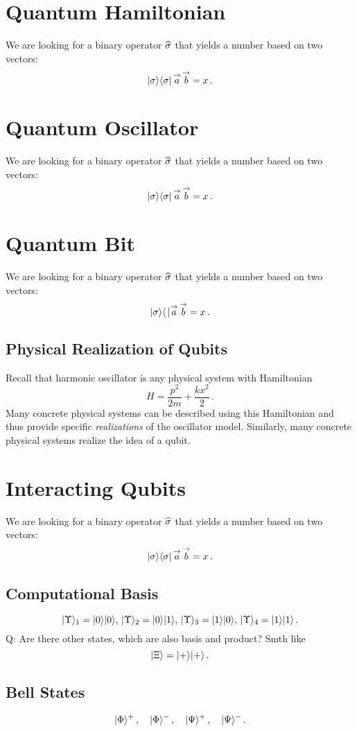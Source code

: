\section{Quantum Hamiltonian}\label{sec:QuantumHamiltonian}
We are looking for a binary operator $\widehat{\sigma}$ that yields a number
based on two vectors:
\[
|{\sigma}\rangle\langle{\sigma}|\,\overset{\rightarrow}{a}\,\overset{\rightarrow}{b}=x\,.
\]

\section{Quantum Oscillator}\label{sec:QuantumOscillator}
We are looking for a binary operator $\widehat{\sigma}$ that yields a number
based on two vectors:
\[
|{\sigma}\rangle\langle{\sigma}|\,\overset{\rightarrow}{a}\,\overset{\rightarrow}{b}=x\,.
\]

\section{Quantum Bit}\label{sec:Qubit}
We are looking for a binary operator $\widehat{\sigma}$ that yields a number
based on two vectors:
\[
|{\sigma}\rangle\langle{\,}|\overset{\rightarrow}{a}\,\overset{\rightarrow}{b}=x\,.
\]
\subsection{Physical Realization of Qubits}
Recall that harmonic oscillator is any physical system with Hamiltonian
\[
H = \frac{p^2}{2m}+\frac{kx^2}{2}\,.
\] 
Many concrete physical systems can be described using this Hamiltonian and thus provide specific \emph{realizations} of 
the oscillator model. Similarly, many concrete physical systems realize the idea of a qubit.

\section{Interacting Qubits}\label{sec:InteractingQubits}
We are looking for a binary operator $\widehat{\sigma}$ that yields a number
based on two vectors:
\[
|{\sigma}\rangle\langle{\sigma}|\,\overset{\rightarrow}{a}\,\overset{\rightarrow}{b}=x\,.
\]
\subsection{Computational Basis}
\[
|{\Upsilon}\rangle_1 = |{0}\rangle|{0}\rangle,\,|{\Upsilon}\rangle_2 = |{0}\rangle|{1}\rangle,\,
|{\Upsilon}\rangle_3 = |{1}\rangle|{0}\rangle,\,|{\Upsilon}\rangle_4 = |{1}\rangle|{1}\rangle\,.
\]
Q: Are there other states, which are also basis and product? Smth like
\[
|{\Xi}\rangle=|{+}\rangle|{+}\rangle\,.
\]

\subsection{Bell States}
\[
|{\Phi}\rangle^{+}\,,\quad|{\Phi}\rangle^{-}\,,\quad
|{\Psi}\rangle^{+}\,,\quad|{\Psi}\rangle^{-}\,.
\]


